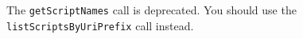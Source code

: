 The \verb+getScriptNames+ call is deprecated. You should use the \verb+listScriptsByUriPrefix+ call instead.
